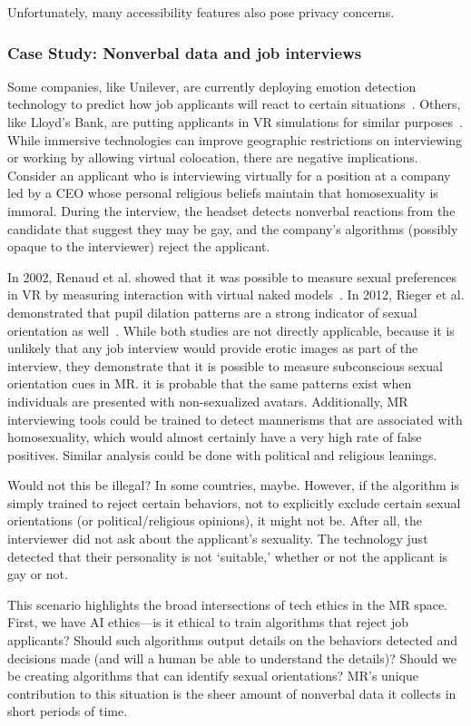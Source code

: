 Unfortunately, many accessibility features also pose privacy concerns.

\subsubsection{Case Study: Nonverbal data and job interviews}
Some companies, like Unilever, are currently deploying emotion detection technology to predict how job applicants will react to certain situations~\cite{gilliland}. Others, like Lloyd's Bank, are putting applicants in VR simulations for similar purposes~\cite{guardian2018how}. While immersive technologies can improve geographic restrictions on interviewing or working by allowing virtual colocation, there are negative implications. Consider an applicant who is interviewing virtually for a position at a company led by a CEO whose personal religious beliefs maintain that homosexuality is immoral. During the interview, the headset detects nonverbal reactions from the candidate that suggest they may be gay, and the company's algorithms (possibly opaque to the interviewer) reject the applicant.

In 2002, Renaud et al. showed that it was possible to measure sexual preferences in VR by measuring interaction with virtual naked models~\cite{renaud}. In 2012, Rieger et al. demonstrated that pupil dilation patterns are a strong indicator of sexual orientation as well~\cite{rieger}. While both studies are not directly applicable, because it is unlikely that any job interview would provide erotic images as part of the interview, they demonstrate that it is possible to measure subconscious sexual orientation cues in MR. it is probable that the same patterns exist when individuals are presented with non-sexualized avatars. Additionally, MR interviewing tools could be trained to detect mannerisms that are associated with homosexuality, which would almost certainly have a very high rate of false positives. Similar analysis could be done with political and religious leanings.

Would not this be illegal? In some countries, maybe. However, if the algorithm is simply trained to reject certain behaviors, not to explicitly exclude certain sexual orientations (or political/religious opinions), it might not be. After all, the interviewer did not ask about the applicant's sexuality. The technology just detected that their personality is not `suitable,' whether or not the applicant is gay or not.

This scenario highlights the broad intersections of tech ethics in the MR space. First, we have AI ethics---is it ethical to train algorithms that reject job applicants? Should such algorithms output details on the behaviors detected and decisions made (and will a human be able to understand the details)? Should we be creating algorithms that can identify sexual orientations? MR's unique contribution to this situation is the sheer amount of nonverbal data it collects in short periods of time.

